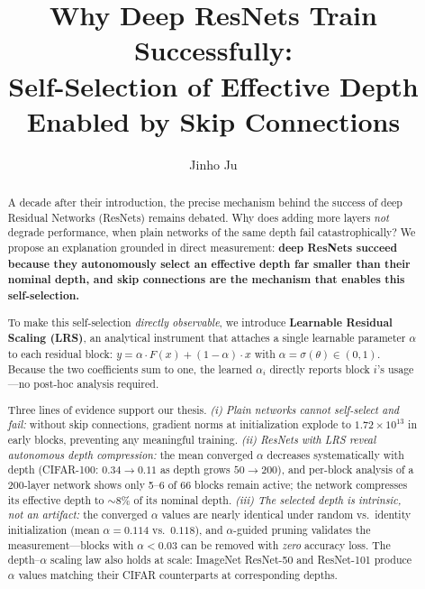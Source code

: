 \documentclass[preprint,12pt]{elsarticle}
\begin{document}
\begin{frontmatter}

\title{Why Deep ResNets Train Successfully:\\Self-Selection of Effective Depth Enabled by Skip Connections}

\author[suwon]{Jinho Ju}


\begin{abstract}
A decade after their introduction, the precise mechanism behind the success of deep Residual Networks (ResNets) remains debated. Why does adding more layers \emph{not} degrade performance, when plain networks of the same depth fail catastrophically? We propose an explanation grounded in direct measurement: \textbf{deep ResNets succeed because they autonomously select an effective depth far smaller than their nominal depth, and skip connections are the mechanism that enables this self-selection.}

To make this self-selection \emph{directly observable}, we introduce \textbf{Learnable Residual Scaling (LRS)}, an analytical instrument that attaches a single learnable parameter $\alpha$ to each residual block: $y = \alpha \cdot F(x) + (1 - \alpha) \cdot x$ with $\alpha = \sigma(\theta) \in (0,1)$. Because the two coefficients sum to one, the learned $\alpha_i$ directly reports block $i$'s usage---no post-hoc analysis required.

Three lines of evidence support our thesis. \emph{(i) Plain networks cannot self-select and fail:} without skip connections, gradient norms at initialization explode to $1.72 \times 10^{13}$ in early blocks, preventing any meaningful training. \emph{(ii) ResNets with LRS reveal autonomous depth compression:} the mean converged $\alpha$ decreases systematically with depth (CIFAR-100: $0.34 \to 0.11$ as depth grows $50 \to 200$), and per-block analysis of a 200-layer network shows only 5--6 of 66 blocks remain active; the network compresses its effective depth to $\sim$8\% of its nominal depth. \emph{(iii) The selected depth is intrinsic, not an artifact:} the converged $\alpha$ values are nearly identical under random vs.\ identity initialization (mean $\alpha = 0.114$ vs.\ $0.118$), and $\alpha$-guided pruning validates the measurement---blocks with $\alpha < 0.03$ can be removed with \emph{zero} accuracy loss. The depth--$\alpha$ scaling law also holds at scale: ImageNet ResNet-50 and ResNet-101 produce $\alpha$ values matching their CIFAR counterparts at corresponding depths.


\end{abstract}
\end{frontmatter}
\end{document}
